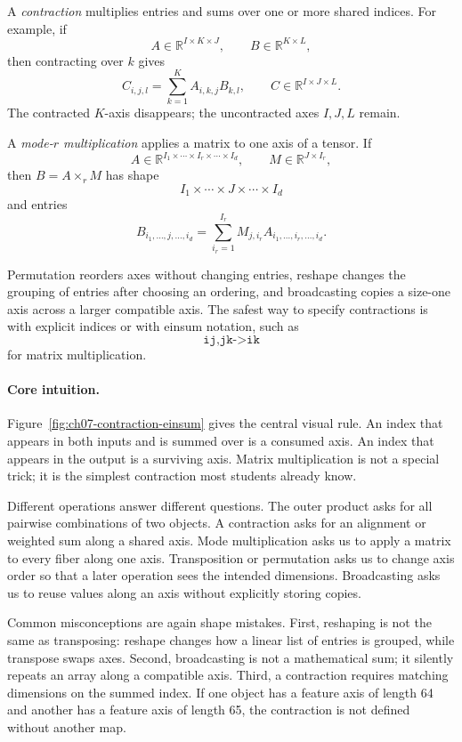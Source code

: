 A \emph{contraction} multiplies entries and sums over one or more shared indices. For example, if
\[
A\in\mathbb{R}^{I\times K\times J},
\qquad
B\in\mathbb{R}^{K\times L},
\]
then contracting over \(k\) gives
\[
C_{i,j,l}
=\sum_{k=1}^{K}A_{i,k,j}B_{k,l},
\qquad
C\in\mathbb{R}^{I\times J\times L}.
\]
The contracted \(K\)-axis disappears; the uncontracted axes \(I,J,L\) remain.

A \emph{mode-\(r\) multiplication} applies a matrix to one axis of a tensor. If
\[
A\in\mathbb{R}^{I_1\times\cdots\times I_r\times\cdots\times I_d},
\qquad
M\in\mathbb{R}^{J\times I_r},
\]
then \(B=A\times_r M\) has shape
\[
I_1\times\cdots\times J\times\cdots\times I_d
\]
and entries
\[
B_{i_1,\ldots,j,\ldots,i_d}
=\sum_{i_r=1}^{I_r}
M_{j,i_r}A_{i_1,\ldots,i_r,\ldots,i_d}.
\]

Permutation reorders axes without changing entries, reshape changes the grouping of entries after choosing an ordering, and broadcasting copies a size-one axis across a larger compatible axis. The safest way to specify contractions is with explicit indices or with einsum notation, such as
\[
\texttt{ij,jk->ik}
\]
for matrix multiplication.

\paragraph{Core intuition.}
Figure~\ref{fig:ch07-contraction-einsum} gives the central visual rule. An index that appears in both inputs and is summed over is a consumed axis. An index that appears in the output is a surviving axis. Matrix multiplication is not a special trick; it is the simplest contraction most students already know.

Different operations answer different questions. The outer product asks for all pairwise combinations of two objects. A contraction asks for an alignment or weighted sum along a shared axis. Mode multiplication asks us to apply a matrix to every fiber along one axis. Transposition or permutation asks us to change axis order so that a later operation sees the intended dimensions. Broadcasting asks us to reuse values along an axis without explicitly storing copies.

Common misconceptions are again shape mistakes. First, reshaping is not the same as transposing: reshape changes how a linear list of entries is grouped, while transpose swaps axes. Second, broadcasting is not a mathematical sum; it silently repeats an array along a compatible axis. Third, a contraction requires matching dimensions on the summed index. If one object has a feature axis of length 64 and another has a feature axis of length 65, the contraction is not defined without another map.


